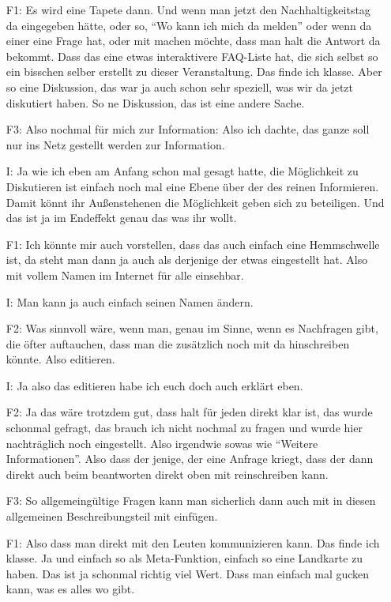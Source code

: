 \begin{itemize}
    \item[F1:] Es wird eine Tapete dann. Und wenn man jetzt den Nachhaltigkeitstag da eingegeben hätte, oder so, "`Wo kann ich mich da melden"' oder wenn da einer eine Frage hat, oder mit machen möchte, dass man halt die Antwort da bekommt. Dass das eine etwas interaktivere FAQ-Liste hat, die sich selbst so ein bisschen selber erstellt zu dieser Veranstaltung. Das finde ich klasse. Aber so eine Diskussion, das war ja auch schon sehr speziell, was wir da jetzt diskutiert haben. So ne Diskussion, das ist eine andere Sache.
    \item[F3:] Also nochmal für mich zur Information: Also ich dachte, das ganze soll nur ins Netz gestellt werden zur Information.
    \item[I:] Ja wie ich eben am Anfang schon mal gesagt hatte, die Möglichkeit zu Diskutieren ist einfach noch mal eine Ebene über der des reinen Informieren. Damit könnt ihr Außenstehenen die Möglichkeit geben sich zu beteiligen. Und das ist ja im Endeffekt genau das was ihr wollt.
    \item[F1:] Ich könnte mir auch vorstellen, dass das auch einfach eine Hemmschwelle ist, da steht man dann ja auch als derjenige der etwas eingestellt hat. Also mit vollem Namen im Internet für alle einsehbar.
    \item[I:] Man kann ja auch einfach seinen Namen ändern.
    \item[F2:] Was sinnvoll wäre, wenn man, genau im Sinne, wenn es Nachfragen gibt, die öfter auftauchen, dass man die zusätzlich noch mit da hinschreiben könnte. Also editieren.
    \item[I:] Ja also das editieren habe ich euch doch auch erklärt eben.
    \item[F2:] Ja das wäre trotzdem gut, dass halt für jeden direkt klar ist, das wurde schonmal gefragt, das brauch ich nicht nochmal zu fragen und wurde hier nachträglich noch eingestellt. Also irgendwie sowas wie "`Weitere Informationen"'. Also dass der jenige, der eine Anfrage kriegt, dass der dann direkt auch beim beantworten direkt oben mit reinschreiben kann.
    \item[F3:] So allgemeingültige Fragen kann man sicherlich dann auch mit in diesen allgemeinen Beschreibungsteil mit einfügen.
    \item[F1:] Also dass man direkt mit den Leuten kommunizieren kann. Das finde ich klasse. Ja und einfach so als Meta-Funktion, einfach so eine Landkarte zu haben. Das ist ja schonmal richtig viel Wert. Dass man einfach mal gucken kann, was es alles wo gibt.

\end{itemize}
